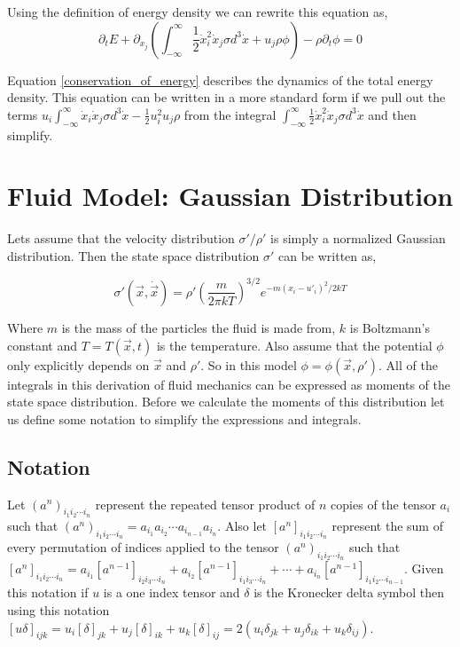 \documentclass[%
 twocolumn,
 amsmath,amssymb,
 aps,
]{revtex4-1}
\newcommand{\dvec}[1]{\dot{\vec{#1}}}
\newcommand{\intVdot}[1]{\int_{-\infty}^{\infty} #1 d^3\dot{x}}
\begin{document}
Using the definition of energy density we can rewrite this equation as, 
\begin{equation}
\partial_t E + \partial_{x_j}\left(\intVdot{\frac{1}{2}\dot{x}_i^2\dot{x}_j\sigma} + u_j\rho\phi\right) - \rho\partial_t\phi=0
\label{conservation_of_energy}
\end{equation}

Equation \eqref{conservation_of_energy} describes the dynamics of the total energy density. This equation can be written in a more standard form if we pull out the terms $u_i\intVdot{\dot{x}_i\dot{x}_j\sigma} - \frac{1}{2}u_i^2u_j\rho$ from the integral $\intVdot{\frac{1}{2}\dot{x}_i^2\dot{x}_j\sigma}$ and then simplify.

\section{Fluid Model: Gaussian Distribution}
Lets assume that the velocity distribution $\sigma'/\rho'$ is simply a normalized Gaussian distribution. Then the state space distribution $\sigma'$ can be written as,

\begin{equation}
\sigma'(\vec{x}, \dvec{x}) = \rho'\left(\frac{m}{2\pi kT}\right)^{3/2}e^{-m\left(x_i - u'_i\right)^2/2kT}
\label{gaussian_state_space}
\end{equation}

Where $m$ is the mass of the particles the fluid is made from, $k$ is Boltzmann's constant and $T=T(\vec{x}, t)$ is the temperature. Also assume that the potential $\phi$ only explicitly depends on $\vec{x}$ and $\rho'$. So in this model $\phi=\phi(\vec{x}, \rho')$. All of the integrals in this derivation of fluid mechanics can be expressed as moments of the state space distribution. Before we calculate the moments of this distribution let us define some notation to simplify the expressions and integrals.

\subsection{Notation}
Let $\left(a^n\right)_{i_1i_2\cdots i_n}$ represent the repeated tensor product of $n$ copies of the tensor $a_i$ such that $\left(a^n\right)_{i_1i_2\cdots i_n}=a_{i_1}a_{i_2}\cdots a_{i_{n-1}}a_{i_n}$. Also let $\left[a^n\right]_{i_1i_2\cdots i_n}$ represent the sum of every permutation of indices applied to the tensor $\left(a^n\right)_{i_1i_2\cdots i_n}$ such that $\left[a^n\right]_{i_1i_2\cdots i_n}=a_{i_1}\left[a^{n-1}\right]_{i_2i_3\cdots i_n} + a_{i_2}\left[a^{n-1}\right]_{i_1i_3\cdots i_n} + \cdots + a_{i_n}\left[a^{n-1}\right]_{i_1i_2\cdots i_{n-1}}$. Given this notation if $u$ is a one index tensor and $\delta$ is the Kronecker delta symbol then using this notation $\left[u\delta\right]_{ijk}=u_i\left[\delta\right]_{jk} + u_j\left[\delta\right]_{ik} + u_k\left[\delta\right]_{ij}=2\left(u_i\delta_{jk} + u_j\delta_{ik} + u_k\delta_{ij}\right)$.
\end{document}
